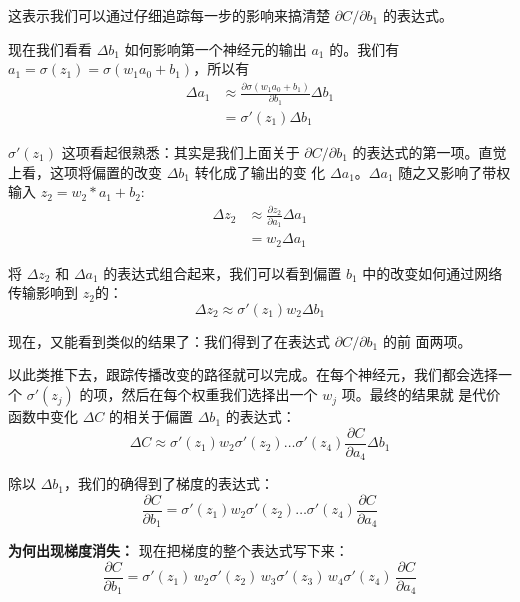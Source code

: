 这表示我们可以通过仔细追踪每一步的影响来搞清楚 $\partial C/\partial b_1$ 的表达式。 

现在我们看看 $\Delta b_1$ 如何影响第一个神经元的输出 $a_1$ 的。我们有 $a_1 =
\sigma(z_1) = \sigma(w_1 a_0 + b_1)$，所以有
\begin{align}
  \Delta a_1 & \approx 
  \frac{\partial \sigma(w_1 a_0+b_1)}{\partial b_1} \Delta b_1 \label{eq:115}\tag{115}\\
  & = \sigma'(z_1) \Delta b_1 \label{eq:116}\tag{116}
\end{align}
 
$\sigma'(z_1)$ 这项看起很熟悉：其实是我们上面关于 $\partial C/\partial b_1$
的表达式的第一项。直觉上看，这项将偏置的改变 $\Delta b_1$ 转化成了输出的变
化 $\Delta a_1$。$\Delta a_1$ 随之又影响了带权输入 $z_2 = w_2 * a_1 +
b_2$:
\begin{align}
  \Delta z_2 & \approx
  \frac{\partial z_2}{\partial a_1} \Delta a_1 \label{eq:117}\tag{117}\\
  & = w_2 \Delta a_1 \label{eq:118}\tag{118}
\end{align}

将 $\Delta z_2$ 和 $\Delta a_1$ 的表达式组合起来，我们可以看到偏置 $b_1$
中的改变如何通过网络传输影响到 $z_2$的：
\begin{equation}
  \Delta z_2 \approx \sigma'(z_1) w_2 \Delta b_1
  \label{eq:119}\tag{119}
\end{equation}
 
现在，又能看到类似的结果了：我们得到了在表达式 $\partial C/\partial b_1$ 的前
面两项。

以此类推下去，跟踪传播改变的路径就可以完成。在每个神经元，我们都会选择一
个 $\sigma'(z_j)$ 的项，然后在每个权重我们选择出一个 $w_j$ 项。最终的结果就
是代价函数中变化 $\Delta C$ 的相关于偏置 $\Delta b_1$ 的表达式：
\begin{equation}
  \Delta C \approx \sigma'(z_1) w_2 \sigma'(z_2) \ldots \sigma'(z_4)
  \frac{\partial C}{\partial a_4} \Delta b_1
\label{eq:120}\tag{120}
\end{equation}

除以 $\Delta b_1$，我们的确得到了梯度的表达式：
\begin{equation}
  \frac{\partial C}{\partial b_1} = \sigma'(z_1) w_2 \sigma'(z_2) \ldots
  \sigma'(z_4) \frac{\partial C}{\partial a_4}
\label{eq:121}\tag{121}
\end{equation}
 
\textbf{为何出现梯度消失：} 现在把梯度的整个表达式写下来：
\begin{equation}
  \frac{\partial C}{\partial b_1} = \sigma'(z_1) \, w_2 \sigma'(z_2) \, w_3
  \sigma'(z_3) \, w_4 \sigma'(z_4) \, \frac{\partial C}{\partial a_4}
  \label{eq:122}\tag{122}
\end{equation}
 
